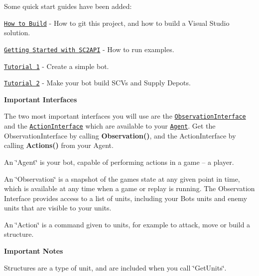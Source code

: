 Some quick start guides have been added\+:

\href{../building.md}{\tt How to Build} -\/ How to git this project, and how to build a Visual Studio solution.

\href{../getting_started.md}{\tt Getting Started with S\+C2\+A\+PI} -\/ How to run examples.

\href{../tutorial1.md}{\tt Tutorial 1} -\/ Create a simple bot.

\href{../tutorial2.md}{\tt Tutorial 2} -\/ Make your bot build S\+CV\textquotesingle{}s and Supply Depots.





{\bfseries Important Interfaces}

The two most important interfaces you will use are the \href{classsc2_1_1_observation_interface.html}{\tt Observation\+Interface} and the \href{classsc2_1_1_action_interface.html}{\tt Action\+Interface} which are available to your \href{classsc2_1_1_agent.html}{\tt Agent}. Get the Observation\+Interface by calling {\bfseries Observation()}, and the Action\+Interface by calling {\bfseries Actions()} from your Agent.

An \char`\"{}\+Agent\char`\"{} is your bot, capable of performing actions in a game -- a player.

An \char`\"{}\+Observation\char`\"{} is a snapshot of the game\textquotesingle{}s state at any given point in time, which is available at any time when a game or replay is running. The Observation Interface provides access to a list of units, including your Bot\textquotesingle{}s units and enemy units that are visible to your units.

An \char`\"{}\+Action\char`\"{} is a command given to units, for example to attack, move or build a structure.





{\bfseries Important Notes}


\begin{DoxyItemize}
\item Structures are a type of unit, and are included when you call \char`\"{}\+Get\+Units\char`\"{}. 
\end{DoxyItemize}